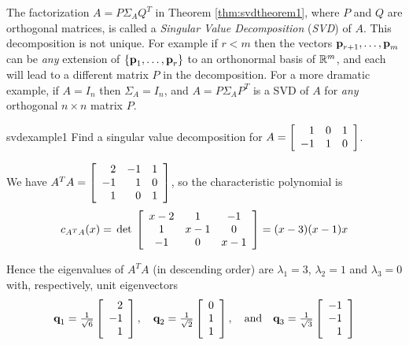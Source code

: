 The factorization $A=P\Sigma _{A}Q^{T}$ in Theorem \ref{thm:svdtheorem1}, where $P$ and $Q$
are orthogonal matrices, is called a \emph{Singular Value Decomposition} (\emph{SVD}) of $A$. This decomposition is not unique. For example if $r<m$ then the vectors $\textbf{p}_{r+1},\ldots ,\textbf{p}_{m}$ can be \emph{any}
extension of $\{\textbf{p}_{1},\ldots ,\textbf{p}_{r}\}$ to an orthonormal
basis of $\mathbb{R}^{m}$, and each will lead to a different matrix $P$ in
the decomposition. For a more dramatic example, if $A=I_{n}$ then $\Sigma_{A}=I_{n}$, and $A=P\Sigma_{A}P^{T}$ is a SVD of $A$ for \emph{any} orthogonal $n\times n$ matrix $P$. 

\begin{example}{}{svdexample1}
Find a singular value decomposition for $A=
\left[ 
\begin{array}{rrr}
1 & 0 & 1 \\ 
-1 & 1 & 0
\end{array}
\right]$.

\begin{solution} We have $A^{T}A=
\left[ 
\begin{array}{rrr}
2 & -1 & 1 \\ 
-1 & 1 & 0 \\ 
1 & 0 & 1
\end{array}
\right]$, so the characteristic polynomial is 
\begin{equation*}
c_{A^{T}A}(x)=\thinspace\operatorname{det\medspace}
\left[ 
\begin{array}{ccc}
x-2 & 1 & -1 \\ 
1 & x-1 & 0 \\ 
-1 & 0 & x-1
\end{array}
\right] =(x-3)(x-1)x
\end{equation*}

\noindent Hence the eigenvalues of $A^{T}A$ (in descending order) are $\lambda_{1}=3$, $\lambda_{2}=1$ and $\lambda_{3}=0$ with, respectively, unit eigenvectors 
\begin{equation*}
\textbf{q}_{1}=\tfrac{1}{\sqrt{6}}
\left[ 
\begin{array}{r}
2 \\ 
-1 \\ 
1
\end{array}
\right], \quad  \textbf{q}_{2}=\tfrac{1}{\sqrt{2}}
\left[ 
\begin{array}{r}
0 \\ 
1 \\ 
1
\end{array}
\right],\quad  \mbox{and} \quad \textbf{q}_{3}=\tfrac{1}{\sqrt{3}}
\left[ 
\begin{array}{r}
-1 \\ 
-1 \\ 
1
\end{array}
\right]
\end{equation*}


\end{solution}
\end{example}
